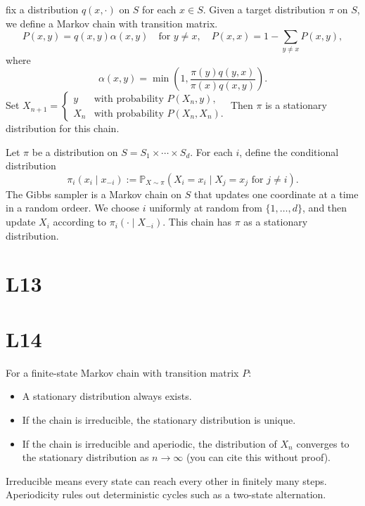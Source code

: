 \documentclass[answers,12pt,addpoints]{exam}
\begin{document}
\begin{definition}
  fix a distribution $q(x,\cdot)$ on $S$ for each $x\in S$. Given a target distribution $\pi$ on $S$, we define a Markov chain with transition matrix.
\[
P(x,y) = q(x,y) \alpha(x,y) \quad \text{for } y\neq x, \quad P(x,x) = 1 - \sum_{y\neq x} P(x,y),
\]
where
\[
\alpha(x,y) = \min\left(1, \frac{\pi(y)q(y,x)}{\pi(x)q(x,y)}\right).
\]
Set $X_{n+1} = \begin{cases}
y & \text{with probability } P(X_n,y),\\
X_n & \text{with probability } P(X_n,X_n).
\end{cases}$
Then $\pi$ is a stationary distribution for this chain.
\end{definition}


\begin{definition}
  Let $\pi$ be a distribution on $S = S_1 \times \cdots \times S_d$. For each $i$, define the conditional distribution
\[
\pi_i(x_i \mid x_{-i}) := \mathbb{P}_{X\sim\pi}(X_i = x_i \mid X_j = x_j \text{ for } j\neq i).
\]
The Gibbs sampler is a Markov chain on $S$ that updates one coordinate at a time
in a random ordeer. We choose $i$ uniformly at random from $\{1,\dots,d\}$, and then update $X_i$ according to $\pi_i(\cdot \mid X_{-i})$. This chain has $\pi$ as a stationary distribution.   
\end{definition}



\section{L13}

\section{L14}

\begin{remark}
For a finite-state Markov chain with transition matrix $P$:
\begin{itemize}
  \item A stationary distribution always exists.
  \item If the chain is irreducible, the stationary distribution is unique.
  \item If the chain is irreducible and aperiodic, the distribution of $X_n$ converges to the stationary distribution as $n\to\infty$ (you can cite this without proof).
\end{itemize}
Irreducible means every state can reach every other in finitely many steps. Aperiodicity rules out deterministic cycles such as a two-state alternation.
\end{remark}
\end{document}
